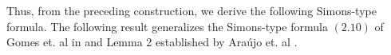 \documentclass[leqno,11pt]{amsart}
\theoremstyle{plain}
\theoremstyle{definition}
\numberwithin{equation}{section}
\begin{document}
Thus, from the preceding construction, we derive the following Simons-type formula. The following result generalizes the Simons-type formula $(2.10)$ of Gomes et. al in \cite{nazareno} and Lemma 2 established by Araújo et. al \cite{Araujo:17}.
\end{document}
